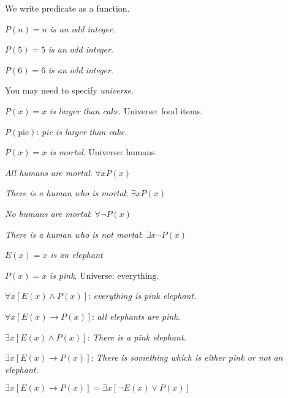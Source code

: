 We write predicate as a function.

\begin{ex}

$P(n) = n$ \textit{is an odd integer}.

$P(5) = 5$ \textit{is an odd integer}.

$P(6) = 6$ \textit{is an odd integer}.

\end{ex}

You may need to specify \textit{universe}.

\begin{ex}

$P(x) = x$ \textit{is larger than cake}. Universe: food items.

$P(\text{pie})$: \textit{pie is larger than cake.}

\end{ex}

\begin{ex}

$P(x) = x$ \textit{is mortal}. Universe: humans.

\textit{All humans are mortal}: $\forall x P(x)$

\textit{There is a human who is mortal}: $\exists x P(x)$

\textit{No humans are mortal}: $\forall \lnot P(x)$

\textit{There is a human who is not mortal}: $\exists x \lnot P(x)$

\end{ex}

\begin{ex}

$E(x) = x$ \textit{is an elephant}

$P(x) = x$ \textit{is pink}. Universe: everything.

$\forall x [ E(x) \land  P(x) ]$: \textit{everything is pink elephant.}

$\forall x [ E(x) \rightarrow P(x) ]$: \textit{all elephants are pink.}

$\exists x [ E(x) \land P(x) ]$: \textit{There is a pink elephant.}

$\exists x [ E(x) \rightarrow P(x) ]$: \textit{There is something which is either pink or not an elephant.}

\end{ex}

\begin{remark}

$\exists x [ E(x) \rightarrow P(x) ] = \exists x [ \lnot E(x) \lor P(x) ]$

\end{remark}

